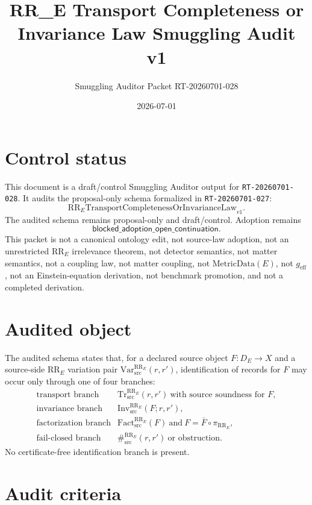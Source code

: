 \documentclass[11pt]{article}
\title{RR\_E Transport Completeness or Invariance Law Smuggling Audit v1}
\author{Smuggling Auditor Packet RT-20260701-028}
\date{2026-07-01}
\newcommand{\RRE}{\mathrm{RR}_{E}}
\newcommand{\VarRR}{\mathrm{Var}^{\RRE}_{\mathrm{src}}}
\newcommand{\TrRR}{\mathrm{Tr}^{\RRE}_{\mathrm{src}}}
\newcommand{\InvRR}{\mathrm{Inv}^{\RRE}_{\mathrm{src}}}
\newcommand{\FactRR}{\mathrm{Fact}^{\RRE}_{\mathrm{src}}}
\newcommand{\SepRR}{\#^{\RRE}_{\mathrm{src}}}
\newcommand{\LawRR}{\mathrm{RR}_{E}\mathrm{TransportCompletenessOrInvarianceLaw}_{v1}}
\newcommand{\MetricData}{\mathrm{MetricData}}
\newcommand{\geff}{g_{\mathrm{eff}}}
\newcommand{\BlockedOpen}{\mathsf{blocked\_adoption\_open\_continuation}}
\begin{document}
\maketitle

\section{Control status}

This document is a draft/control Smuggling Auditor output for
\texttt{RT-20260701-028}. It audits the proposal-only schema formalized in
\texttt{RT-20260701-027}:
\[
  \LawRR .
\]
The audited schema remains proposal-only and draft/control. Adoption remains
\[
  \BlockedOpen .
\]
This packet is not a canonical ontology edit, not source-law adoption, not an
unrestricted \(\RRE\) irrelevance theorem, not detector semantics, not matter
semantics, not a coupling law, not matter coupling, not \(\MetricData(E)\), not
\(\geff\), not an Einstein-equation derivation, not benchmark promotion, and
not a completed derivation.

\section{Audited object}

The audited schema states that, for a declared source object \(F:D_E\to X\) and
a source-side \(\RRE\) variation pair \(\VarRR(r,r')\), identification of
records for \(F\) may occur only through one of four branches:
\[
\begin{array}{ll}
\text{transport branch} & \TrRR(r,r')\ \text{with source soundness for }F,\\
\text{invariance branch} & \InvRR(F;r,r'),\\
\text{factorization branch} & \FactRR(F)\ \text{and}\ F=\bar F\circ\pi_{\RRE},\\
\text{fail-closed branch} & \SepRR(r,r')\ \text{or obstruction}.
\end{array}
\]
No certificate-free identification branch is present.

\section{Audit criteria}
\end{document}
